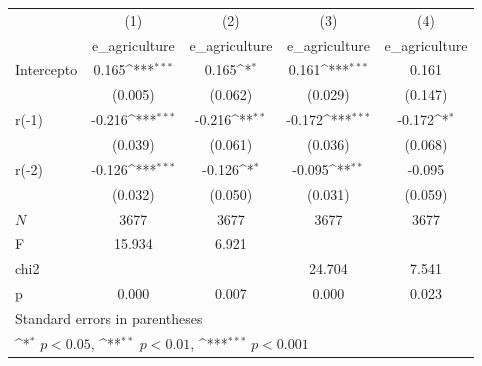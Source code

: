 {
\def\sym#1{\ifmmode^{#1}\else\(^{#1}\)\fi}
\begin{longtable}{l*{4}{c}}
\hline\hline\endfirsthead\hline\endhead\hline\endfoot\endlastfoot
            &\multicolumn{1}{c}{(1)}&\multicolumn{1}{c}{(2)}&\multicolumn{1}{c}{(3)}&\multicolumn{1}{c}{(4)}\\
            &\multicolumn{1}{c}{e\_agriculture}&\multicolumn{1}{c}{e\_agriculture}&\multicolumn{1}{c}{e\_agriculture}&\multicolumn{1}{c}{e\_agriculture}\\
\hline
Intercepto  &       0.165\sym{***}&       0.165\sym{*}  &       0.161\sym{***}&       0.161         \\
            &     (0.005)         &     (0.062)         &     (0.029)         &     (0.147)         \\
r(-1)       &      -0.216\sym{***}&      -0.216\sym{**} &      -0.172\sym{***}&      -0.172\sym{*}  \\
            &     (0.039)         &     (0.061)         &     (0.036)         &     (0.068)         \\
r(-2)       &      -0.126\sym{***}&      -0.126\sym{*}  &      -0.095\sym{**} &      -0.095         \\
            &     (0.032)         &     (0.050)         &     (0.031)         &     (0.059)         \\
\hline
\(N\)       &        3677         &        3677         &        3677         &        3677         \\
F           &      15.934         &       6.921         &                     &                     \\
chi2        &                     &                     &      24.704         &       7.541         \\
p           &       0.000         &       0.007         &       0.000         &       0.023         \\
\hline\hline
\multicolumn{5}{l}{\footnotesize Standard errors in parentheses}\\
\multicolumn{5}{l}{\footnotesize \sym{*} \(p<0.05\), \sym{**} \(p<0.01\), \sym{***} \(p<0.001\)}\\
\end{longtable}
}
